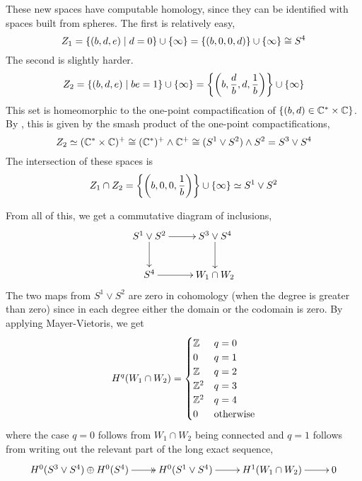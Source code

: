 These new spaces have computable homology, since they can be
identified with spaces built from spheres. The first is relatively
easy,
\[ Z_1 = \left\{ (b,d,e)\mid d = 0 \right\}\cup \left\{ \infty \right\} =
\left\{ (b,0,0,d) \right\}\cup\left\{ \infty \right\} \cong S^4 \]
The second is slightly harder.
\[ Z_2 =\left\{ (b,d,e)\mid be=1 \right\}\cup\left\{ \infty \right\}=
\left\{ \left(b,\frac{d}{b},d,\frac{1}{b} \right)  \right\}\cup\left\{ \infty \right\} \]
This set is homeomorphic to the one-point compactification of
$\left\{ (b,d)\in \mathbb{C}^*\times \mathbb{C} \right\}$. By \cite[Chapter~2.3]{dupontk}, this
is given by the smash product of the one-point compactifications,
\[ Z_2\simeq (\mathbb{C}^*\times\mathbb{C})^+ \cong (\mathbb{C}^*)^+\wedge\mathbb{C}^+ \cong (S^1\vee
S^2) \wedge S^2 = S^3 \vee S^4 \]
The intersection of these spaces is
\[ Z_1\cap Z_2 = \left\{ \left(b,0,0,\frac{1}{b}\right) \right\}\cup\left\{ \infty \right\}
\simeq S^1\vee S^2 \]

From all of this, we get a commutative diagram of inclusions,
\[ \xymatrix{
  S^1\vee S^2 \ar[r]\ar[d] & S^3\vee S^4 \ar[d] \\
  S^4 \ar[r] & W_1\cap W_2
} \]
The two maps from $S^1\vee S^2$ are zero in cohomology (when the
degree is greater than zero) since in each
degree either the domain or the codomain is zero. By applying
Mayer-Vietoris, we get
\[ H^q(W_1\cap W_2) =
\begin{cases}
  \mathbb{Z} & q=0 \\
  0 & q = 1 \\
  \mathbb{Z} & q = 2 \\
  \mathbb{Z}^2 & q = 3 \\
  \mathbb{Z}^2 & q =4 \\
  0 & \text{otherwise}
\end{cases} \]
where the case $q=0$ follows from $W_1\cap W_2$ being connected
and $q = 1$ follows from writing out the relevant part of the
long exact sequence,
\[ \xymatrix{ H^0(S^3\vee S^4)\oplus H^0(S^4) \ar@{->>}[r] &
H^0(S^1\vee S^4) \ar[r] & H^1(W_1\cap W_2) \ar[r] & 0} \]

